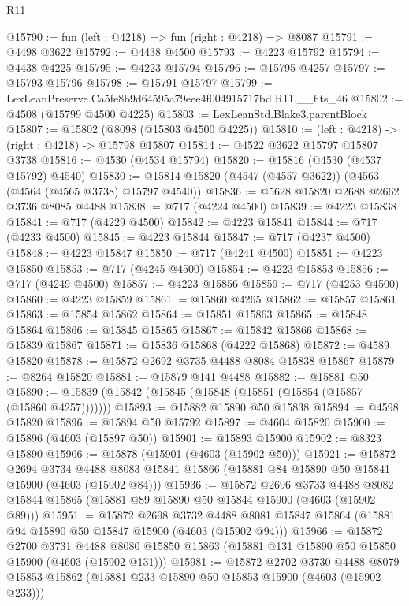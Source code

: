 \begin{lexlean}{R11}
\begin{coremodule}
@15790 := fun (left : @4218) => fun (right : @4218) => @8087
@15791 := @4498 @3622
@15792 := @4438 @4500
@15793 := @4223 @15792
@15794 := @4438 @4225
@15795 := @4223 @15794
@15796 := @15795 @4257
@15797 := @15793 @15796
@15798 := @15791 @15797
@15799 := LexLeanPreserve.Ca5fe8b9d64595a79eee4f004915717bd.R11.__fits_46
@15802 := @4508 (@15799 @4500 @4225)
@15803 := LexLeanStd.Blake3.parentBlock
@15807 := @15802 (@8098 (@15803 @4500 @4225))
@15810 := (left : @4218) -> (right : @4218) -> @15798 @15807
@15814 := @4522 @3622 @15797 @15807 @3738
@15816 := @4530 (@4534 @15794)
@15820 := @15816 (@4530 (@4537 @15792) @4540)
@15830 := @15814 @15820 (@4547 (@4557 @3622)) (@4563 (@4564 (@4565 @3738) @15797 @4540))
@15836 := @5628 @15820 @2688 @2662 @3736 @8085 @4488
@15838 := @717 (@4224 @4500)
@15839 := @4223 @15838
@15841 := @717 (@4229 @4500)
@15842 := @4223 @15841
@15844 := @717 (@4233 @4500)
@15845 := @4223 @15844
@15847 := @717 (@4237 @4500)
@15848 := @4223 @15847
@15850 := @717 (@4241 @4500)
@15851 := @4223 @15850
@15853 := @717 (@4245 @4500)
@15854 := @4223 @15853
@15856 := @717 (@4249 @4500)
@15857 := @4223 @15856
@15859 := @717 (@4253 @4500)
@15860 := @4223 @15859
@15861 := @15860 @4265
@15862 := @15857 @15861
@15863 := @15854 @15862
@15864 := @15851 @15863
@15865 := @15848 @15864
@15866 := @15845 @15865
@15867 := @15842 @15866
@15868 := @15839 @15867
@15871 := @15836 @15868 (@4222 @15868)
@15872 := @4589 @15820
@15878 := @15872 @2692 @3735 @4488 @8084 @15838 @15867
@15879 := @8264 @15820
@15881 := @15879 @141 @4488
@15882 := @15881 @50
@15890 := @15839 (@15842 (@15845 (@15848 (@15851 (@15854 (@15857 (@15860 @4257)))))))
@15893 := @15882 @15890 @50 @15838
@15894 := @4598 @15820
@15896 := @15894 @50 @15792
@15897 := @4604 @15820
@15900 := @15896 (@4603 (@15897 @50))
@15901 := @15893 @15900
@15902 := @8323 @15890
@15906 := @15878 (@15901 (@4603 (@15902 @50)))
@15921 := @15872
    @2694
    @3734
    @4488
    @8083
    @15841
    @15866
    (@15881 @84 @15890 @50 @15841 @15900 (@4603 (@15902 @84)))
@15936 := @15872
    @2696
    @3733
    @4488
    @8082
    @15844
    @15865
    (@15881 @89 @15890 @50 @15844 @15900 (@4603 (@15902 @89)))
@15951 := @15872
    @2698
    @3732
    @4488
    @8081
    @15847
    @15864
    (@15881 @94 @15890 @50 @15847 @15900 (@4603 (@15902 @94)))
@15966 := @15872
    @2700
    @3731
    @4488
    @8080
    @15850
    @15863
    (@15881 @131 @15890 @50 @15850 @15900 (@4603 (@15902 @131)))
@15981 := @15872
    @2702
    @3730
    @4488
    @8079
    @15853
    @15862
    (@15881 @233 @15890 @50 @15853 @15900 (@4603 (@15902 @233)))

\end{coremodule}
\end{lexlean}
